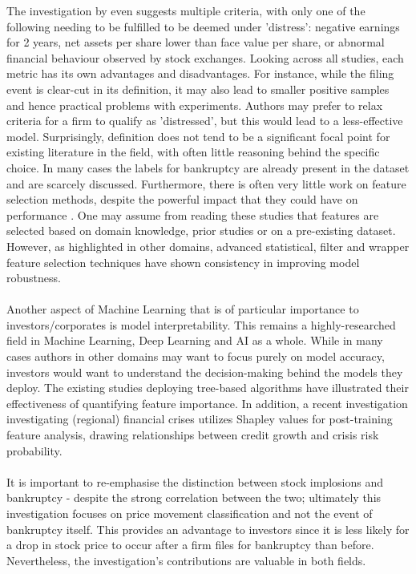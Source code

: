\documentclass[a4paper]{report}
\begin{document}
The investigation by \cite{jiang2018corporate} even suggests multiple criteria, with only one of the following needing to be fulfilled to be deemed under 'distress': negative earnings for 2 years, net assets per share lower than face value per share, 
or abnormal financial behaviour observed by stock exchanges. Looking across all studies, each metric has its own advantages and disadvantages. For instance,
while the filing event is clear-cut in its definition, it may also lead to smaller positive samples and hence practical problems with experiments. Authors may prefer to relax criteria for a firm to qualify as 'distressed', but this would 
lead to a less-effective model. Surprisingly, definition does not tend to be a significant focal point for existing literature in the field, with often little reasoning behind the specific choice. In many cases the labels for bankruptcy are already present in the dataset and are scarcely discussed. Furthermore, there is often very little work on feature selection methods, despite the powerful impact that they could have on performance \citep{zhao2024survey}. 
One may assume from reading these studies that features are 
selected based on domain knowledge, prior studies or on a pre-existing dataset. However, as highlighted in other domains, advanced statistical, filter and wrapper feature selection techniques have shown consistency in improving model robustness.\\\\Another aspect of Machine Learning that is of particular importance to investors/corporates is model interpretability. This remains a highly-researched
field in Machine Learning, Deep Learning and AI as a whole. While in many cases authors in other domains may want to focus purely on model accuracy, investors would want to understand the decision-making behind the models they deploy. The existing studies deploying tree-based algorithms have illustrated their effectiveness of quantifying feature importance. In addition, a recent investigation \citep{bluwstein2023credit} investigating (regional) financial crises
utilizes Shapley values for post-training feature analysis, drawing relationships between credit growth and crisis risk probability.\\\\It is important
to re-emphasise the distinction between stock implosions and bankruptcy - despite the strong correlation between the two; ultimately this investigation focuses on price movement classification and not the event of bankruptcy itself. This provides an advantage to investors since it is less likely 
for a drop in stock price to occur after a firm files for bankruptcy than before. Nevertheless, the investigation's contributions are valuable in both fields. 
\end{document}
